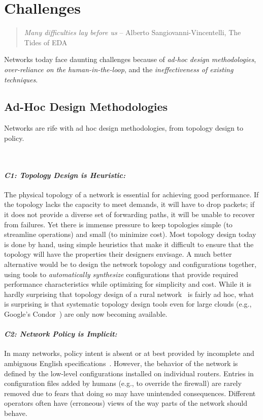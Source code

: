 \section{Challenges}
\label{sec:challenges}

\begin{quote}
{\em Many difficulties lay before us} -- Alberto
Sangiovanni-Vincentelli, The Tides of EDA~\cite{alberto}
\vspace{-2mm}
\end{quote}

Networks today face daunting challenges because of {\em ad-hoc design methodologies}, {\em over-reliance on the human-in-the-loop}, and the {\em ineffectiveness of existing techniques}.

\subsection{Ad-Hoc Design Methodologies}

Networks are rife with ad hoc design methodologies, from topology design to policy.

\
\paragraph*{\em C1: Topology Design is Heuristic:}
%
The physical topology of a network is essential for achieving good performance. If the topology lacks the capacity to meet demands, it will have to drop packets; if it does not provide a diverse set of forwarding paths, it will be unable to recover from failures.  Yet there is immense pressure to keep topologies simple (to streamline operations) and small (to minimize cost). Most topology design today is done by hand, using simple heuristics that make it difficult to ensure that the topology will have the properties their designers envisage. A much better alternative would be to design the network topology and configurations together, using tools to {\em automatically synthesize} configurations that provide required performance characteristics while optimizing for simplicity and cost. While it is
hardly surprising that topology design of a rural network~\cite{barathwisp} is fairly ad hoc, what is surprising is that systematic topology design tools even for large clouds (e.g.,  Google's Condor~\cite{condor}) are only now becoming available.

\paragraph*{\em C2: Network Policy is Implicit:}
%
In many networks, policy intent is absent or at best provided by incomplete and ambiguous English specifications~\cite{propane}. However, the behavior of the network is defined by the low-level configurations installed on individual routers. Entries in configuration files added by humans (e.g., to override the firewall) are rarely removed due to fears that doing so may have unintended consequences. Different operators often have (erroneous) views of the way parts of the network should behave.

